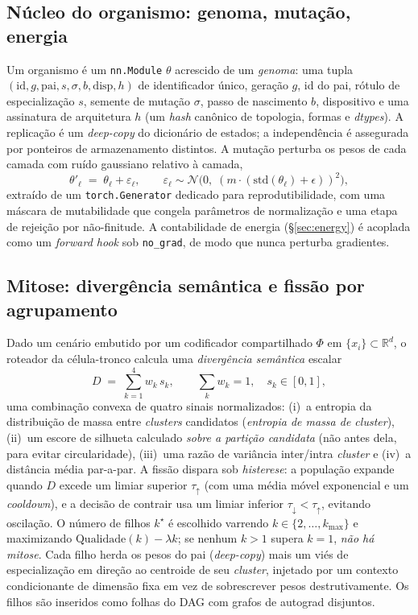 \documentclass[11pt]{article}
\newcommand{\R}{\mathbb{R}}
\begin{document}
\subsection{Núcleo do organismo: genoma, mutação, energia}
Um organismo é um \texttt{nn.Module} $\theta$ acrescido de um \emph{genoma}: uma
tupla $(\mathrm{id}, g, \mathrm{pai}, s, \sigma, b, \mathrm{disp}, h)$ de
identificador único, geração $g$, id do pai, rótulo de especialização $s$,
semente de mutação $\sigma$, passo de nascimento $b$, dispositivo e uma assinatura
de arquitetura $h$ (um \emph{hash} canônico de topologia, formas e \emph{dtypes}).
A replicação é um \emph{deep-copy} do dicionário de estados; a independência é
assegurada por ponteiros de armazenamento distintos. A mutação perturba os pesos
de cada camada com ruído gaussiano relativo à camada,
\begin{equation}
\theta'_\ell \;=\; \theta_\ell + \varepsilon_\ell,\qquad
\varepsilon_\ell \sim \mathcal{N}\!\big(0,\; (m\cdot(\mathrm{std}(\theta_\ell)+\epsilon))^2\big),
\end{equation}
extraído de um \texttt{torch.Generator} dedicado para reprodutibilidade, com uma
máscara de mutabilidade que congela parâmetros de normalização e uma etapa de
rejeição por não-finitude. A contabilidade de energia (\S\ref{sec:energy}) é
acoplada como um \emph{forward hook} sob \texttt{no\_grad}, de modo que nunca
perturba gradientes.

\subsection{Mitose: divergência semântica e fissão por agrupamento}
Dado um cenário embutido por um codificador compartilhado $\Phi$ em
$\{x_i\}\subset\R^d$, o roteador da célula-tronco calcula uma \emph{divergência
semântica} escalar
\begin{equation}
D \;=\; \sum_{k=1}^{4} w_k\, s_k, \qquad
\textstyle\sum_k w_k = 1,\quad s_k\in[0,1],
\label{eq:divergence}
\end{equation}
uma combinação convexa de quatro sinais normalizados: (i)~a entropia da
distribuição de massa entre \emph{clusters} candidatos (\emph{entropia de massa de
cluster}), (ii)~um escore de silhueta \cite{rousseeuw1987silhouettes} calculado
\emph{sobre a partição candidata} (não antes dela, para evitar circularidade),
(iii)~uma razão de variância inter/intra \emph{cluster} e (iv)~a distância média
par-a-par. A fissão dispara sob \emph{histerese}: a população expande quando $D$
excede um limiar superior $\tau_{\uparrow}$ (com uma média móvel exponencial e um
\emph{cooldown}), e a decisão de contrair usa um limiar inferior
$\tau_{\downarrow}<\tau_{\uparrow}$, evitando oscilação. O número de filhos
$k^\star$ é escolhido varrendo $k\in\{2,\dots,k_{\max}\}$ e maximizando
$\mathrm{Qualidade}(k)-\lambda k$; se nenhum $k>1$ supera $k=1$, \emph{não há
mitose}. Cada filho herda os pesos do pai (\emph{deep-copy}) mais um viés de
especialização em direção ao centroide de seu \emph{cluster}, injetado por um
contexto condicionante de dimensão fixa em vez de sobrescrever pesos
destrutivamente. Os filhos são inseridos como folhas do DAG com grafos de
autograd disjuntos.
\end{document}
